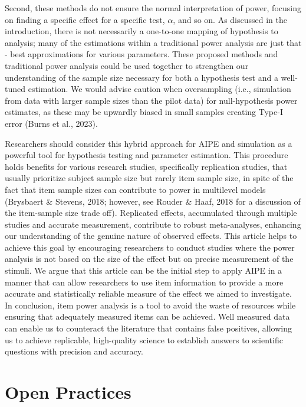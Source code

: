 \documentclass[
  man]{apa7}
\begin{document}
Second, these methods do not ensure the normal interpretation of power, focusing on finding a specific effect for a specific test, \(\alpha\), and so on. As discussed in the introduction, there is not necessarily a one-to-one mapping of hypothesis to analysis; many of the estimations within a traditional power analysis are just that - best approximations for various parameters. These proposed methods and traditional power analysis could be used together to strengthen our understanding of the sample size necessary for both a hypothesis test and a well-tuned estimation. We would advise caution when oversampling (i.e., simulation from data with larger sample sizes than the pilot data) for null-hypothesis power estimates, as these may be upwardly biased in small samples creating Type-I error (Burns et al., 2023).

Researchers should consider this hybrid approach for AIPE and simulation as a powerful tool for hypothesis testing and parameter estimation. This procedure holds benefits for various research studies, specifically replication studies, that usually prioritize subject sample size but rarely item sample size, in spite of the fact that item sample sizes can contribute to power in multilevel models (Brysbaert \& Stevens, 2018; however, see Rouder \& Haaf, 2018 for a discussion of the item-sample size trade off). Replicated effects, accumulated through multiple studies and accurate measurement, contribute to robust meta-analyses, enhancing our understanding of the genuine nature of observed effects. This article helps to achieve this goal by encouraging researchers to conduct studies where the power analysis is not based on the size of the effect but on precise measurement of the stimuli. We argue that this article can be the initial step to apply AIPE in a manner that can allow researchers to use item information to provide a more accurate and statistically reliable measure of the effect we aimed to investigate. In conclusion, item power analysis is a tool to avoid the waste of resources while ensuring that adequately measured items can be achieved. Well measured data can enable us to counteract the literature that contains false positives, allowing us to achieve replicable, high-quality science to establish answers to scientific questions with precision and accuracy.

\section{Open Practices}\label{open-practices}
\end{document}
